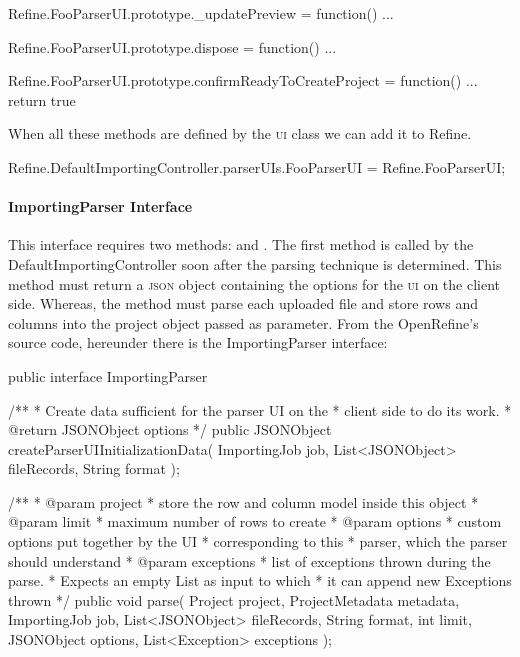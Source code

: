 \begin{code}
Refine.FooParserUI.prototype._updatePreview = function() {
...
}

Refine.FooParserUI.prototype.dispose = function() {
...
}

Refine.FooParserUI.prototype.confirmReadyToCreateProject = 
                                              function() {
...
return true
}
\end{code}
When all these methods are defined by the \textsc{ui} class we can add it to Refine.
\begin{code}
Refine.DefaultImportingController.parserUIs.FooParserUI =
                                         Refine.FooParserUI;
\end{code}

\paragraph{ImportingParser Interface} This interface requires two methods:  and . The first method is called by the DefaultImportingController soon after the parsing technique is determined. This method must return a \textsc{json} object containing the options for the \textsc{ui} on the client side. Whereas, the  method must parse each uploaded file and store rows and columns into the project object passed as parameter. From the OpenRefine's source code, hereunder there is the ImportingParser interface:
\begin{code}
public interface ImportingParser {
    /**
     * Create data sufficient for the parser UI on the 
     * client side to do its work.
     * @return JSONObject options
     */
    public JSONObject createParserUIInitializationData(
        ImportingJob job,
        List<JSONObject> fileRecords,
        String format
    );

    /**
     * @param project
     *	 store the row and column model inside this object
     * @param limit
     *   maximum number of rows to create
     * @param options
     *     custom options put together by the UI 
     *     corresponding to this
     *     parser, which the parser should understand
     * @param exceptions
     *     list of exceptions thrown during the parse. 
     *     Expects an empty List as input to which 
     *     it can append new Exceptions thrown
     */
    public void parse(
        Project project,
        ProjectMetadata metadata,
        ImportingJob job,
        List<JSONObject> fileRecords,
        String format,
        int limit,
        JSONObject options,
        List<Exception> exceptions
    );
}
\end{code}
